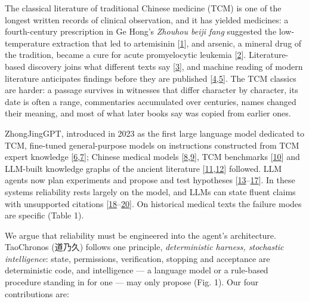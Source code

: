 \documentclass[
]{article}
\begin{document}
The classical literature of traditional Chinese medicine (TCM) is one of
the longest written records of clinical observation, and it has yielded
medicines: a fourth-century prescription in Ge Hong's \emph{Zhouhou
beiji fang} suggested the low-temperature extraction that led to
artemisinin {[}\protect\hyperlink{ref-tu2011artemisinin}{1}{]}, and
arsenic, a mineral drug of the tradition, became a cure for acute
promyelocytic leukemia {[}\protect\hyperlink{ref-wang2008apl}{2}{]}.
Literature-based discovery joins what different texts say
{[}\protect\hyperlink{ref-swanson1986fish}{3}{]}, and machine reading of
modern literature anticipates findings before they are published
{[}\protect\hyperlink{ref-tshitoyan2019unsupervised}{4},\protect\hyperlink{ref-krenn2023forecasting}{5}{]}.
The TCM classics are harder: a passage survives in witnesses that differ
character by character, its date is often a range, commentaries
accumulated over centuries, names changed their meaning, and most of
what later books say was copied from earlier ones.

ZhongJingGPT, introduced in 2023 as the first large language model
dedicated to TCM, fine-tuned general-purpose models on instructions
constructed from TCM expert knowledge
{[}\protect\hyperlink{ref-kang2025zhongjinggpt}{6},\protect\hyperlink{ref-cmlm2023zhongjing}{7}{]};
Chinese medical models
{[}\protect\hyperlink{ref-zhang2023huatuogpt}{8},\protect\hyperlink{ref-yang2024zhongjing}{9}{]},
TCM benchmarks {[}\protect\hyperlink{ref-yue2024tcmbench}{10}{]} and
LLM-built knowledge graphs of the ancient literature
{[}\protect\hyperlink{ref-li2025tcmrdkg}{11},\protect\hyperlink{ref-xiang2025kgclassics}{12}{]}
followed. LLM agents now plan experiments and propose and test
hypotheses
{[}\protect\hyperlink{ref-boiko2023autonomous}{13}--\protect\hyperlink{ref-lu2026endtoend}{17}{]}.
In these systems reliability rests largely on the model, and LLMs can
state fluent claims with unsupported citations
{[}\protect\hyperlink{ref-ji2023hallucination}{18}--\protect\hyperlink{ref-thirunavukarasu2023llm}{20}{]}.
On historical medical texts the failure modes are specific (Table 1).

We argue that reliability must be engineered into the agent's
architecture. TaoChronos (道乃久) follows one principle,
\emph{deterministic harness, stochastic intelligence}: state,
permissions, verification, stopping and acceptance are deterministic
code, and intelligence --- a language model or a rule-based procedure
standing in for one --- may only propose (Fig. 1). Our four
contributions are:
\end{document}
